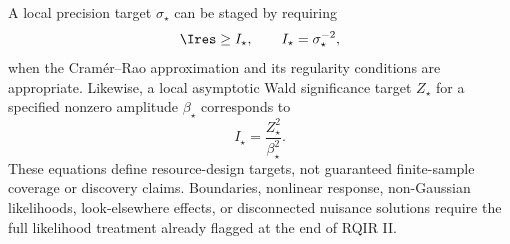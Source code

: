 A local precision target $\sigma_\star$ can be staged by requiring
\begin{equation}
 \Ires\ge I_\star,
 \qquad
 I_\star=\sigma_\star^{-2},
\label{eq:precision-target}
\end{equation}
when the Cram\'er--Rao approximation and its regularity conditions are appropriate. Likewise, a local asymptotic Wald significance target $Z_\star$ for a specified nonzero amplitude $\beta_\star$ corresponds to
\begin{equation}
 I_\star=\frac{Z_\star^2}{\beta_\star^2}.
\label{eq:wald-target}
\end{equation}
These equations define resource-design targets, not guaranteed finite-sample coverage or discovery claims. Boundaries, nonlinear response, non-Gaussian likelihoods, look-elsewhere effects, or disconnected nuisance solutions require the full likelihood treatment already flagged at the end of RQIR II.
